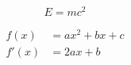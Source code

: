 
\begin{equation}
  E = mc^2
  \label{eq:einstein}
\end{equation}

\begin{align}
  f(x) &= ax^2 + bx + c \label{eq:quad} \\
  f'(x) &= 2ax + b
\end{align}

